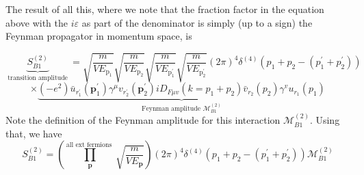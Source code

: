 The result of all this, where we note that the fraction factor in the equation above with the $i\varepsilon$ as part of the denominator is simply (up to a sign) the Feynman propagator in momentum space, is
\begin{qt}
    $$
\underbrace{S_{B 1}^{(2)}}_{\text { transition amplitude }}=\sqrt{\frac{m}{V E_{\mathrm{p}_1}}} \sqrt{\frac{m}{V E_{\mathrm{p}_2}}} \sqrt{\frac{m}{V E_{\mathrm{p}_1^{\prime}}}} \sqrt{\frac{m}{V E_{\mathrm{p}^{\prime}_{2}}}}(2 \pi)^{4} \delta^{(4)}\left(p_{1}+p_{2}-\left(p_{1}^{\prime}+p_{2}^{\prime}\right)\right)
$$
$$
\times \underbrace{\left(-e^{2}\right) \bar{u}_{r_{1}^{\prime}}\left(\mathbf{p}_{1}^{\prime}\right) \gamma^{\mu} v_{r_{2}^{\prime}}\left(\mathbf{p}_{2}^{\prime}\right) i D_{F \mu v}\left(k=p_{1}+p_{2}\right) \bar{v}_{r_{2}}\left(p_{2}\right) \gamma^{v} u_{r_{1}}\left(p_{1}\right)}_{\text {Feynman amplitude } \mathcal{M}_{B 1}^{(2)}}
$$
Note the definition of the Feynman amplitude for this interaction $\mathcal{M}_{B 1}^{(2)}$. Using that, we have
\begin{equation}
S_{B 1}^{(2)}=\left(\prod_{\mathbf{p}}^{\text {all ext fermions }} \sqrt{\frac{m}{V E_{\mathbf{p}}}}\right)(2 \pi)^{4} \delta^{(4)}\left(p_{1}+p_{2}-\left(p_{1}^{\prime}+p_{2}^{\prime}\right)\right) \mathcal{M}_{B 1}^{(2)}
\end{equation}
\end{qt}
